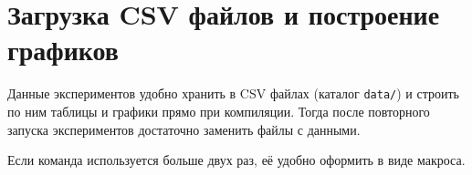 
\section{Загрузка CSV файлов и построение графиков}

Данные экспериментов удобно хранить в CSV файлах (каталог \texttt{data/})
и строить по ним таблицы и графики прямо при компиляции. Тогда после
повторного запуска экспериментов достаточно заменить файлы с данными.

Если команда используется больше двух раз, её удобно оформить в виде макроса.

\newcommand{\timetable}[2]{%
    \DTLloaddb{data-#1}{\datapath/#1}%
    \begin{table}[H]
        \caption{#2}
        \setlength{\columnsep}{1.5cm}
        \setlength{\columnseprule}{0.2pt}
        \begin{multicols}{3}
            \begin{itemize}
                \DTLforeach{data-#1}{\blocksize=blockSize,\runtime=time}{%
                    \item[\blocksize] \qty{\runtime}{\milli\second}}
            \end{itemize}
        \end{multicols}
    \end{table}
}

